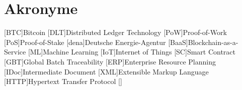 \section*{Akronyme}            %
\begin{acronym}[HTTP]
	[BTC]{Bitcoin}
	[DLT]{Distributed Ledger Technology}
	[PoW]{Proof-of-Work}
	[PoS]{Proof-of-Stake}
	[dena]{Deutsche Energie-Agentur}
	[BaaS]{Blockchain-as-a-Service}
	[ML]{Machine Learning}
	[IoT]{Internet of Things}
	[SC]{Smart Contract}
  [GBT]{Global Batch Traceability}
  [ERP]{Enterprise Resource Planning}
  [IDoc]{Intermediate Document}
  [XML]{Extensible Markup Language}
  [HTTP]{Hypertext Transfer Protocol}
	\acro{}[]{}
\end{acronym}

\newpage

\listoffigures
{}
\listoftables
{}
\newpage
